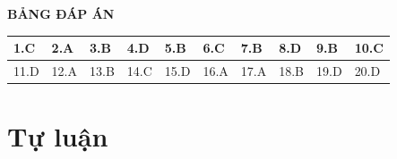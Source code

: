 \whiteBGstarEnd

\loigiai
{
	\begin{center}
		\textbf{BẢNG ĐÁP ÁN}
	\end{center}
	\begin{center}
		\begin{tabular}{|m{2.8em}|m{2.8em}|m{2.8em}|m{2.8em}|m{2.8em}|m{2.8em}|m{2.8em}|m{2.8em}|m{2.8em}|m{2.8em}|}
			\hline
			1.C  & 2.A  & 3.B  & 4.D  & 5.B  & 6.C  & 7.B  & 8.D  & 9.B  & 10.C  \\
			\hline
			11.D  & 12.A  & 13.B  & 14.C  & 15.D  & 16.A  & 17.A  & 18.B  & 19.D  & 20.D  \\
			\hline
		\end{tabular}
	\end{center}
}
\section{Tự luận}
